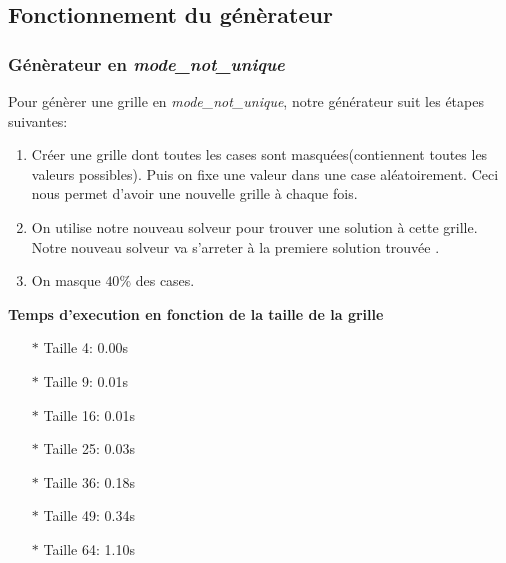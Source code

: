 \documentclass{article}
\begin{document}
\subsection{ Fonctionnement du génèrateur }

  \subsubsection{ Génèrateur en \textit{mode\_not\_unique} }

Pour génèrer une grille en \textit{mode\_not\_unique}, notre générateur suit les étapes suivantes:

\begin{enumerate}
    \item Créer une grille dont toutes les cases sont masquées(contiennent toutes les valeurs possibles). Puis on fixe une valeur dans une case aléatoirement. Ceci nous permet d'avoir une nouvelle grille à chaque fois. \vspace{0.15cm}
    \item On utilise notre nouveau solveur pour trouver une solution à cette grille. Notre nouveau solveur va s'arreter à la premiere solution trouvée .\vspace{0.15cm}
    \item On masque $40\%$ des cases.  \vspace{0.15cm}
\end{enumerate}

\textbf{Temps d'execution en fonction de la taille de la grille}
\vspace{0.2cm}

\begin{itemize}
    \item[$\ast$] Taille 4: 0.00s \vspace{0.12cm}
    \item[$\ast$] Taille 9: 0.01s \vspace{0.12cm}
    \item[$\ast$] Taille 16: 0.01s \vspace{0.12cm}
    \item[$\ast$] Taille 25: 0.03s \vspace{0.12cm}
    \item[$\ast$] Taille 36: 0.18s \vspace{0.12cm}
    \item[$\ast$] Taille 49: 0.34s \vspace{0.12cm}
    \item[$\ast$] Taille 64: 1.10s \vspace{0.12cm}
\end{itemize}
 \vspace{1cm}
 
\end{document}
